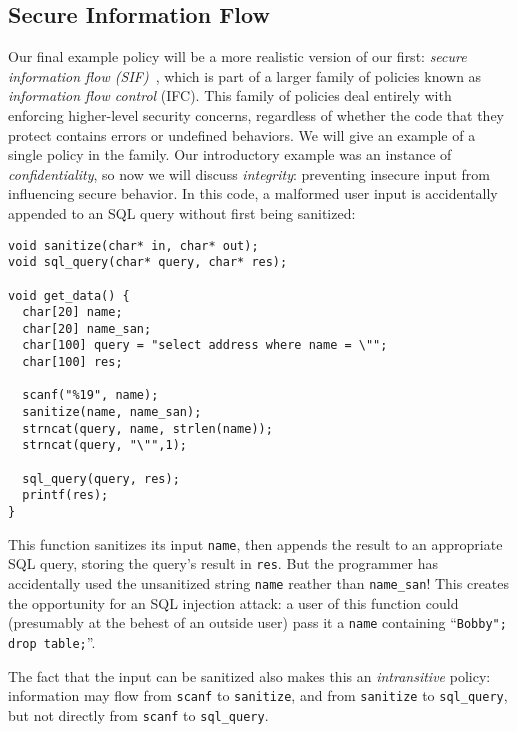 \documentclass{llncs}
\begin{document}
{%


\subsection{Secure Information Flow}
\label{sec:SIF}

Our final example policy will be a more realistic version of our first:
{\em secure information flow (SIF)}~\cite{Denning77:SecureInformationFlow}, which is part of a larger family of policies
known as {\em information flow control} (IFC). 
This family of policies deal entirely with enforcing
higher-level security concerns, regardless of whether the code that they protect contains
errors or undefined behaviors. We will give an example of a single policy in the family.
Our introductory example was an instance of {\em confidentiality}, so now we will discuss
{\em integrity}: preventing insecure input from influencing secure behavior.
In this code, a malformed user input is accidentally appended to an SQL query without first being sanitized:

\begin{verbatim}
void sanitize(char* in, char* out);
void sql_query(char* query, char* res);

void get_data() {
  char[20] name;
  char[20] name_san;
  char[100] query = "select address where name = \"";
  char[100] res;

  scanf("%19", name);
  sanitize(name, name_san);
  strncat(query, name, strlen(name));
  strncat(query, "\"",1);

  sql_query(query, res);
  printf(res);
}
\end{verbatim}

This function sanitizes its input {\tt name}, then appends the result to an appropriate SQL
query, storing the query's result in {\tt res}. But the programmer has accidentally
used the unsanitized string {\tt name} reather than {\tt name\_san}!
This creates the opportunity for an SQL injection attack\cite{??}: a user
of this function could (presumably at the behest of an outside user) pass it a 
{\tt name} containing ``{\tt Bobby"; drop table;}''.

The fact that the input can be sanitized also makes this  an {\em intransitive} policy:
information may flow from {\tt scanf} to {\tt sanitize}, and from {\tt sanitize} to
{\tt sql\_query}, but not directly from {\tt scanf} to {\tt sql\_query}.

}
\end{document}
